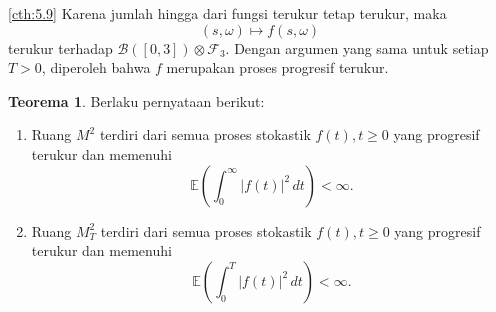 \documentclass[aspectratio=169,11pt]{beamer}
\theoremstyle{definition}
\newtheorem{teorema}{Teorema}
\newcommand{\myref}[1]{\hyperref[#1]{\nameCref{#1} \ref*{#1}}}
\begin{document}
\begin{frame}{\insertsection}{\insertsubsection}
  \begin{exampleblock}{\myref{cth:5.9}}
    Karena jumlah hingga dari fungsi terukur tetap terukur, maka
    \[
      (s,\omega)\mapsto f(s,\omega)
    \]
    terukur terhadap $\mathcal{B}([0,3])\otimes\mathcal{F}_3$. Dengan argumen yang
    sama untuk setiap $T>0$, diperoleh bahwa $f$ merupakan proses progresif terukur.
  \end{exampleblock}
\end{frame}

\begin{frame}{\insertsection}{\insertsubsection}
  \begin{teorema}
    Berlaku pernyataan berikut:
    \begin{enumerate}
      \item Ruang $M^2$ terdiri dari semua proses stokastik $f(t), t \ge 0$ yang progresif terukur dan memenuhi
            \begin{equation*}
              \mathbb{E}\left( \int_0^\infty |f(t)|^2 \, dt \right) < \infty.
            \end{equation*}
      \item Ruang $M_T^2$ terdiri dari semua proses stokastik $f(t), t \ge 0$ yang progresif terukur dan memenuhi
            \begin{equation*}
              \mathbb{E}\left( \int_0^T |f(t)|^2 \, dt \right) < \infty.
            \end{equation*}
    \end{enumerate}
  \end{teorema}
\end{frame}
\end{document}

